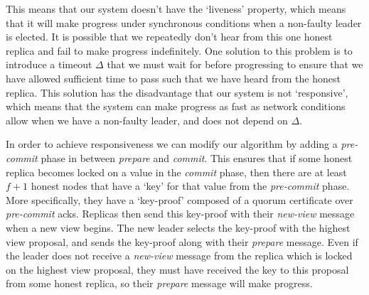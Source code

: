 This means that our system doesn't have the `liveness' property, which means that it will make progress under synchronous conditions when a non-faulty leader is elected. It is possible that we repeatedly don't hear from this one honest replica and fail to make progress indefinitely. One solution to this problem is to introduce a timeout $\Delta$ that we must wait for before progressing to ensure that we have allowed sufficient time to pass such that we have heard from the honest replica. This solution has the disadvantage that our system is not `responsive', which means that the system can make progress as fast as network conditions allow when we have a non-faulty leader, and does not depend on $\Delta$.

In order to achieve responsiveness we can modify our algorithm by adding a \textit{pre-commit} phase in between \textit{prepare} and \textit{commit}. This ensures that if some honest replica becomes locked on a value in the \textit{commit} phase, then there are at least $f + 1$ honest nodes that have a `key' for that value from the \textit{pre-commit} phase. More specifically, they have a `key-proof' composed of a quorum certificate over \textit{pre-commit} acks. Replicas then send this key-proof with their \textit{new-view} message when a new view begins. The new leader selects the key-proof with the highest view proposal, and sends the key-proof along with their \textit{prepare} message. Even if the leader does not receive a \textit{new-view} message from the replica which is locked on the highest view proposal, they must have received the key to this proposal from some honest replica, so their \textit{prepare} message will make progress.

